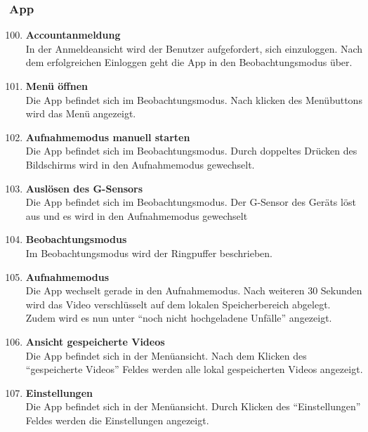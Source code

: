 \subsubsection{\gls{App}}
\begin{enumerate}[\bfseries{T}10]  
\setcounter{enumi}{99}{}

\item \textbf{Accountanmeldung} \hfill\\  
In der Anmeldeansicht wird der Benutzer aufgefordert, sich einzuloggen. Nach dem erfolgreichen Einloggen geht die \gls{App} in den Beobachtungsmodus \"uber. 

\item \textbf{Men\"u \"offnen} \hfill\\
Die \gls{App} befindet sich im Beobachtungsmodus. Nach klicken des Men\"ubuttons wird das Men\"u angezeigt.

\item \textbf{Aufnahmemodus manuell starten} \hfill\\
Die \gls{App} befindet sich im Beobachtungsmodus. Durch doppeltes Dr\"ucken des Bildschirms wird in den Aufnahmemodus gewechselt. 

\item \textbf{Ausl\"osen des \gls{G-Sensor}s} \hfill\\  
Die \gls{App} befindet sich im Beobachtungsmodus. Der \gls{G-Sensor} des Ger\"ats l\"ost aus und es wird in den Aufnahmemodus gewechselt

\item \textbf{Beobachtungsmodus} \hfill\\
Im Beobachtungsmodus wird der \gls{Ringpuffer} beschrieben.

\item \textbf{Aufnahmemodus} \hfill\\  
Die \gls{App} wechselt gerade in den Aufnahmemodus. Nach weiteren 30 Sekunden wird das Video verschl\"usselt auf dem lokalen Speicherbereich abgelegt. Zudem wird es nun unter ``noch nicht hochgeladene Unf\"alle'' angezeigt. 

\item \textbf{Ansicht gespeicherte Videos} \hfill\\
Die \gls{App} befindet sich in der Men\"uansicht. Nach dem Klicken des ``gespeicherte Videos'' Feldes werden alle lokal gespeicherten Videos angezeigt.

\item \textbf{Einstellungen} \hfill\\
Die \gls{App} befindet sich in der Men\"uansicht. Durch Klicken des ``Einstellungen'' Feldes werden die Einstellungen angezeigt.


\end{enumerate}
